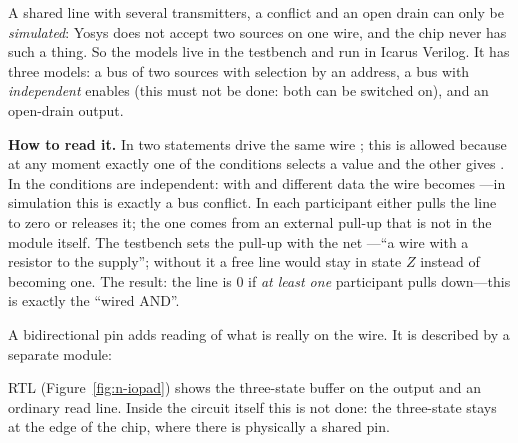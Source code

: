 A shared line with several transmitters, a conflict and an open drain can only
be \emph{simulated}: Yosys does not accept two sources on one wire, and the
chip never has such a thing. So the models live in the testbench
 and run in Icarus Verilog. It has three models: a bus of two
sources with selection by an address, a bus with \emph{independent} enables
(this must not be done: both can be switched on), and an open-drain output.


\textbf{How to read it.} In  two  statements drive
the same wire ; this is allowed because at any moment exactly one of
the conditions selects a value and the other gives . In 
the conditions are independent: with  and different data
the wire becomes ---in simulation this is exactly a bus conflict. In
 each participant either pulls the line to zero or releases
it; the one comes from an external pull-up that is not in the module itself. The
testbench sets the pull-up with the net ---``a wire with a
resistor to the supply''; without it a free line would stay in state $Z$ instead
of becoming one. The result: the line is 0 if \emph{at least one} participant
pulls down---this is exactly the ``wired AND''.

A bidirectional pin adds reading of what is really on the wire. It is
described by a separate module:



RTL (Figure~\ref{fig:n-iopad}) shows the three-state buffer on the output and an
ordinary read line. Inside the circuit itself this is not done: the three-state
stays at the edge of the chip, where there is physically a shared pin.

